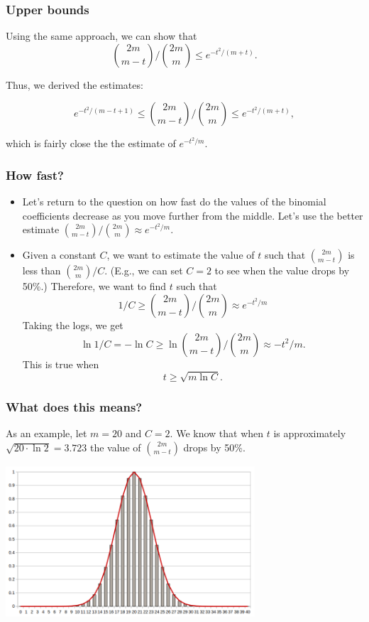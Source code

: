 \begin{frame}\frametitle{Upper bounds}
  Using the same approach, we can show that
  \[
  \binom{2m}{m-t}\Big/\binom{2m}{m}\leq e^{-t^2/(m+t)}.
  \]
  \pause

  Thus, we derived the estimates:
  \begin{tcolorbox}
    \[
    e^{-t^2/(m-t+1)}\leq
    \binom{2m}{m-t}\Big/\binom{2m}{m}
    \leq e^{-t^2/(m+t)},
    \]
  \end{tcolorbox}
  \pause
  which is fairly close the the estimate of $e^{-t^2/m}$.
\end{frame}

\begin{frame}\frametitle{How fast?}
  \begin{itemize}
  \item
    Let's return to the question on how fast do the values of the
    binomial coefficients decrease as you move further from the
    middle.  Let's use the better estimate
    $\binom{2m}{m-t}\big/\binom{2m}{m}\approx e^{-t^2/m}$.  \pause

  \item
    Given a constant $C$, we want to estimate the value of $t$ such
    that $\binom{2m}{m-t}$ is less than $\binom{2m}{m}\big/C$.  (E.g.,
    we can set $C=2$ to see when the value drops by 50\%.) Therefore,
    we want to find $t$ such that
    \[
    1/C \geq 
    \binom{2m}{m-t}\big/\binom{2m}{m}\approx e^{-t^2/m}
    \]
    Taking the logs, we get
    \[
    \ln 1/C = -\ln C \geq 
    \ln \binom{2m}{m-t}\big/\binom{2m}{m}\approx -t^2/m.
    \]
    This is true when
    \[
    t \geq \sqrt{m\ln C}.
    \]
  \end{itemize}
\end{frame}

\begin{frame}\frametitle{What does this means?}
  As an example, let $m=20$ and $C=2$.  We know that when $t$ is
  approximately $\sqrt{20\cdot \ln 2} = 3.723$ the value of
  $\binom{2m}{m-t}$ drops by 50\%.

  \includegraphics[height=2.2in]{images/binom-approx.png}

\end{frame}
